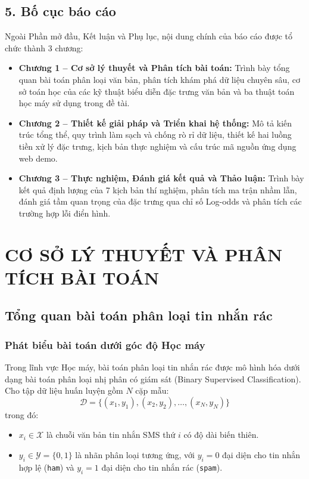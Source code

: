 \documentclass[12pt,a4paper]{report}
\begin{document}
\section*{5. Bố cục báo cáo}
Ngoài Phần mở đầu, Kết luận và Phụ lục, nội dung chính của báo cáo được tổ chức thành 3 chương:
\begin{itemize}
    \item \textbf{Chương 1 -- Cơ sở lý thuyết và Phân tích bài toán:} Trình bày tổng quan bài toán phân loại văn bản, phân tích khám phá dữ liệu chuyên sâu, cơ sở toán học của các kỹ thuật biểu diễn đặc trưng văn bản và ba thuật toán học máy sử dụng trong đề tài.
    \item \textbf{Chương 2 -- Thiết kế giải pháp và Triển khai hệ thống:} Mô tả kiến trúc tổng thể, quy trình làm sạch và chống rò rỉ dữ liệu, thiết kế hai luồng tiền xử lý đặc trưng, kịch bản thực nghiệm và cấu trúc mã nguồn ứng dụng web demo.
    \item \textbf{Chương 3 -- Thực nghiệm, Đánh giá kết quả và Thảo luận:} Trình bày kết quả định lượng của 7 kịch bản thí nghiệm, phân tích ma trận nhầm lẫn, đánh giá tầm quan trọng của đặc trưng qua chỉ số Log-odds và phân tích các trường hợp lỗi điển hình.
\end{itemize}

\chapter{CƠ SỞ LÝ THUYẾT VÀ PHÂN TÍCH BÀI TOÁN}

\section{Tổng quan bài toán phân loại tin nhắn rác}
\subsection{Phát biểu bài toán dưới góc độ Học máy}
Trong lĩnh vực Học máy, bài toán phân loại tin nhắn rác được mô hình hóa dưới dạng bài toán phân loại nhị phân có giám sát (Binary Supervised Classification). Cho tập dữ liệu huấn luyện gồm $N$ cặp mẫu:
\begin{equation}
    \mathcal{D} = \{(x_1, y_1), (x_2, y_2), \dots, (x_N, y_N)\}
\end{equation}
trong đó:
\begin{itemize}
    \item $x_i \in \mathcal{X}$ là chuỗi văn bản tin nhắn SMS thứ $i$ có độ dài biến thiên.
    \item $y_i \in \mathcal{Y} = \{0, 1\}$ là nhãn phân loại tương ứng, với $y_i = 0$ đại diện cho tin nhắn hợp lệ (\texttt{ham}) và $y_i = 1$ đại diện cho tin nhắn rác (\texttt{spam}).
\end{itemize}
\end{document}
